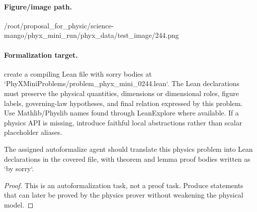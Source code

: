 \paragraph{Figure/image path.}
/root/proposal\_for\_physic/science-mango/phyx\_mini\_run/phyx\_data/test\_image/244.png

\paragraph{Formalization target.}
create a compiling Lean file with sorry bodies at `PhyXMiniProblems/problem\_phyx\_mini\_0244.lean`. The Lean declarations must preserve the physical quantities, dimensions or dimensional roles, figure labels, governing-law hypotheses, and final relation expressed by this problem.
Use Mathlib/Physlib names found through LeanExplore where available. If a physics API is missing, introduce faithful local abstractions rather than scalar placeholder aliases.

\begin{theorem}
\label{thm:physics:phyx_mini_0244:target}
The assigned autoformalize agent should translate this physics problem into Lean declarations in the covered file, with theorem and lemma proof bodies written as `by sorry`.
\end{theorem}
\begin{proof}
This is an autoformalization task, not a proof task. Produce statements that can later be proved by the physics prover without weakening the physical model.
\end{proof}

